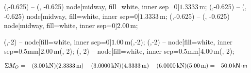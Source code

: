 \documentclass[10pt,oneside]{article}
\begin{document}
\begin{textblock*}{6.5in}
{     (\ddx,-0.625) -- (\AoneX, -0.625) node[midway, fill=white, inner sep=0]{\footnotesize$1.3333\,\text{m}$};
     (\eex,-0.625) -- (\AtwoX, -0.625) node[midway, fill=white, inner sep=0]{\footnotesize$1.3333\,\text{m}$};
     (\AthreeX,-0.625) -- (\ffx, -0.625) node[midway, fill=white, inner sep=0]{\footnotesize$2.00\,\text{m}$};

    \footnotesize
       (\ax,-2) -- node[fill=white, inner sep=0]{$1.00\,\text{m}$}(\ddx,-2);
       (\ddx,-2) -- node[fill=white, inner sep=0.5mm]{$2.00\,\text{m}$}(\eex,-2);
       (\eex,-2) -- node[fill=white, inner sep=0.5mm]{$4.00\,\text{m}$}(\bbx,-2);
  }
  \large
  $$ \Sigma M_O = -(3.00\,\text{kN})(2.3333\,\text{m})-(3.0000\,\text{kN})(4.3333\,\text{m})-(6.0000\,\text{kN})(5.00\,\text{m}) =-50.0\,\mathsf{kN\!\cdot\! m} $$
\end{textblock*}


~\newpage
\end{document}
